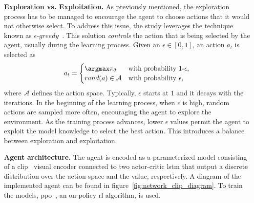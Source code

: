 \textbf{Exploration vs. Exploitation.}
As previously mentioned, the exploration process has to be managed to encourage the agent to choose actions that it would not otherwise select.
To address this issue, the study leverages the technique known as $\epsilon\text{-}greedy$~\cite{mnih2013}.
This solution \emph{controls} the action that is being selected by the agent, usually during the learning process.
Given an $\epsilon \in [0, 1]$, an action $a_t$ is selected as
\begin{equation}
    \label{eq:eps-greedy}
    a_t = \begin{cases}
              \argmax\pi_\theta & \mbox{with probability 1-$\epsilon$,}     \\
              rand(a) \in \mathcal{A} & \mbox{with probability $\epsilon$,} \\
    \end{cases}
\end{equation}
where $\mathcal{A}$ defines the action space.
Typically, $\epsilon$ starts at $1$ and it decays with the iterations.
In the beginning of the learning process, \ie when $\epsilon$ is high, random actions are sampled more often, encouraging the agent to explore the environment.
As the training process advances, lower $\epsilon$ values permit the agent to exploit the model knowledge to select the best action.
This introduces a balance between exploration and exploitation.

\textbf{Agent architecture.} The agent is encoded as a parameterized model consisting of a \acrshort{clip}~\cite{khandelwal2022} visual encoder connected to two actor-critic \acrfull{lstm} that output a discrete distribution over the action space and the value, respectively.
A diagram of the implemented agent can be found in figure~\ref{fig:network_clip_diagram}.
To train the models, \acrfull{ppo}~\cite{schulman2017}, an on-policy \acrshort{rl} algorithm, is used.

